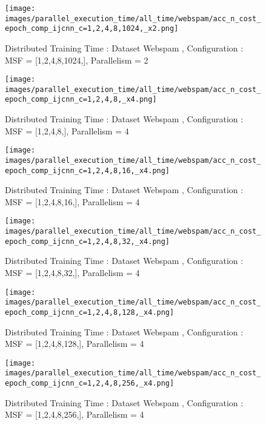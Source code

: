 \begin{figure*}[htbp]
\centering
\texttt{[image: images/parallel\_execution\_time/all\_time/webspam/acc\_n\_cost\_epoch\_comp\_ijcnn\_c=1,2,4,8,1024,\_x2.png]}
\caption{Distributed Training Time : Dataset Webspam , Configuration : MSF = [1,2,4,8,1024,], Parallelism = 2}
\label{fig:dis-msf-tr-time-webspam-x2}
\end{figure*}


\begin{figure*}[htbp]
\centering
\texttt{[image: images/parallel\_execution\_time/all\_time/webspam/acc\_n\_cost\_epoch\_comp\_ijcnn\_c=1,2,4,8,\_x4.png]}
\caption{Distributed Training Time : Dataset Webspam , Configuration : MSF = [1,2,4,8,], Parallelism = 4}
\label{fig:dis-msf-tr-time-webspam-x4}
\end{figure*}


\begin{figure*}[htbp]
\centering
\texttt{[image: images/parallel\_execution\_time/all\_time/webspam/acc\_n\_cost\_epoch\_comp\_ijcnn\_c=1,2,4,8,16,\_x4.png]}
\caption{Distributed Training Time : Dataset Webspam , Configuration : MSF = [1,2,4,8,16,], Parallelism = 4}
\label{fig:dis-msf-tr-time-webspam-x4}
\end{figure*}


\begin{figure*}[htbp]
\centering
\texttt{[image: images/parallel\_execution\_time/all\_time/webspam/acc\_n\_cost\_epoch\_comp\_ijcnn\_c=1,2,4,8,32,\_x4.png]}
\caption{Distributed Training Time : Dataset Webspam , Configuration : MSF = [1,2,4,8,32,], Parallelism = 4}
\label{fig:dis-msf-tr-time-webspam-x4}
\end{figure*}


\begin{figure*}[htbp]
\centering
\texttt{[image: images/parallel\_execution\_time/all\_time/webspam/acc\_n\_cost\_epoch\_comp\_ijcnn\_c=1,2,4,8,128,\_x4.png]}
\caption{Distributed Training Time : Dataset Webspam , Configuration : MSF = [1,2,4,8,128,], Parallelism = 4}
\label{fig:dis-msf-tr-time-webspam-x4}
\end{figure*}


\begin{figure*}[htbp]
\centering
\texttt{[image: images/parallel\_execution\_time/all\_time/webspam/acc\_n\_cost\_epoch\_comp\_ijcnn\_c=1,2,4,8,256,\_x4.png]}
\caption{Distributed Training Time : Dataset Webspam , Configuration : MSF = [1,2,4,8,256,], Parallelism = 4}
\label{fig:dis-msf-tr-time-webspam-x4}
\end{figure*}


